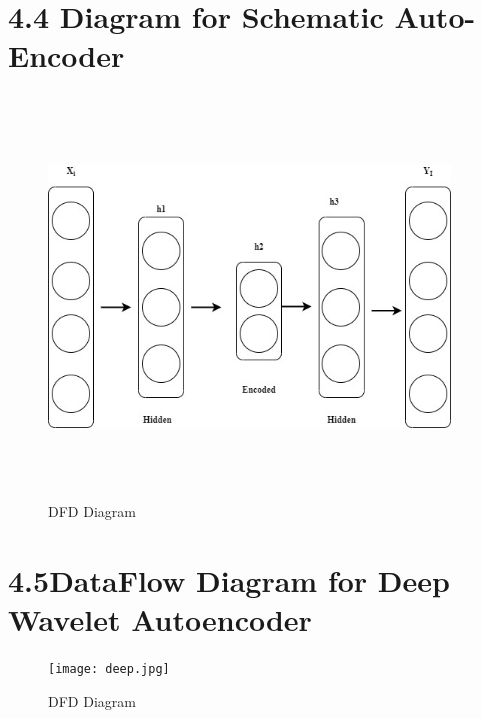 \documentclass[oneside,a4paper,12pt]{book}
\begin{document}
\section*{4.4\hspace*{10pt} Diagram  for Schematic Auto-Encoder}
\begin{Center}
\begin{figure}[H]
	\begin{Center}
		\includegraphics[width=4.2in,height=4.2in]{schematic_AE.jpg}
		\caption{DFD Diagram}
		\label{fig:EndorsersCommitters_Role}
	\end{Center}
\end{figure}
\end{Center}\par




\section*{4.5\hspace*{10pt}DataFlow Diagram for Deep Wavelet Autoencoder}
\begin{Center}
\begin{figure}[H]
	\begin{Center}
		\texttt{[image: deep.jpg]}
		\caption{DFD Diagram}
		\label{fig:EndorsersCommitters_Role}
	\end{Center}
\end{figure}
\end{Center}\par
\end{document}
